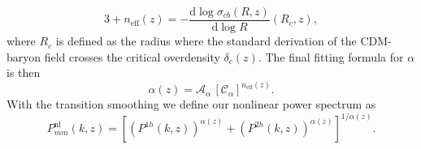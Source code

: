 \documentclass[oneside]{book}
\newcommand*{\rd}{\mathrm{d}}
\begin{document}
\begin{equation}
    3+n_\mathrm{eff}(z) = - \frac{\rd \log \sigma_{cb}(R,z)}{\rd \log R}(R_c,z),
\end{equation}
where $R_c$ is defined as the radius where the standard derivation of the CDM-baryon field crosses the critical overdensity $\delta_c(z)$. The final fitting formula for $\alpha$ is then \begin{equation}
    \alpha(z) = \mathcal{A}_\alpha\,\left[\mathcal{C}_\alpha\right]^{n_\mathrm{eff}(z)}.
\end{equation}
With the transition smoothing we define our nonlinear power spectrum as \begin{equation}
    P^{\mathrm{nl}}_{mm}(k,z) = \left[\left(P^{1h}(k,z)\right)^{\alpha(z)} + \left(P^{2h}(k,z)\right)^{\alpha(z)} \right]^{1/\alpha(z)} .
\end{equation}
\end{document}
